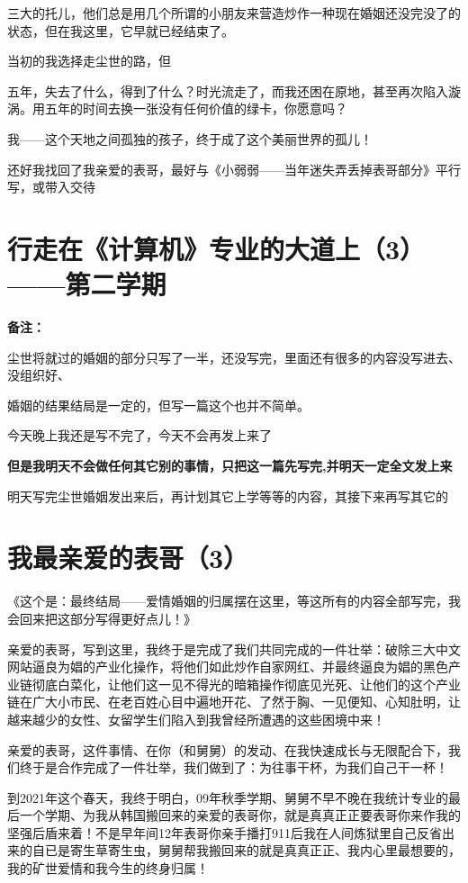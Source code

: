 \documentclass[9pt, b5paper]{article}
\begin{document}
三大的托儿，他们总是用几个所谓的小朋友来营造炒作一种现在婚姻还没完没了的状态，但在我这里，它早就已经结束了。

当初的我选择走尘世的路，但

五年，失去了什么，得到了什么？时光流走了，而我还困在原地，甚至再次陷入漩涡。用五年的时间去换一张没有任何价值的绿卡，你愿意吗？

我——这个天地之间孤独的孩子，终于成了这个美丽世界的孤儿！

还好我找回了我亲爱的表哥，最好与《小弱弱——当年迷失弄丢掉表哥部分》平行写，或带入交待

\section{行走在《计算机》专业的大道上（3）——第二学期}
\label{sec:orged2725c}
\textbf{备注：}

尘世将就过的婚姻的部分只写了一半，还没写完，里面还有很多的内容没写进去、没组织好、

婚姻的结果结局是一定的，但写一篇这个也并不简单。

今天晚上我还是写不完了，今天不会再发上来了

\textbf{但是我明天不会做任何其它别的事情，只把这一篇先写完,并明天一定全文发上来}

明天写完尘世婚姻发出来后，再计划其它上学等等的内容，其接下来再写其它的


\section{我最亲爱的表哥（3）}
\label{sec:orgcbf4094}

《这个是：最终结局——爱情婚姻的归属摆在这里，等这所有的内容全部写完，我会回来把这部分写得更好点儿！》

亲爱的表哥，写到这里，我终于是完成了我们共同完成的一件壮举：破除三大中文网站逼良为娼的产业化操作，将他们如此炒作自家网红、并最终逼良为娼的黑色产业链彻底白菜化，让他们这一见不得光的暗箱操作彻底见光死、让他们的这个产业链在广大小市民、在老百姓心目中遍地开花、了然于胸、一见便知、心知肚明，让越来越少的女性、女留学生们陷入到我曾经所遭遇的这些困境中来！

亲爱的表哥，这件事情、在你（和舅舅）的发动、在我快速成长与无限配合下，我们终于是合作完成了一件壮举，我们做到了：为往事干杯，为我们自己干一杯！

到2021年这个春天，我终于明白，09年秋季学期、舅舅不早不晚在我统计专业的最后一个学期、为我从韩国搬回来的亲爱的表哥你，就是真真正正要表哥你来作我的坚强后盾来着！不是早年间12年表哥你亲手播打911后我在人间炼狱里自己反省出来的自已是寄生草寄生虫，舅舅帮我搬回来的就是真真正正、我内心里最想要的，我的矿世爱情和我今生的终身归属！
\end{document}
